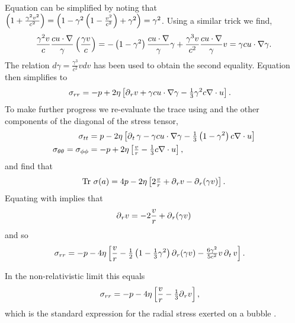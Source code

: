 Equation  can be simplified by noting that $\left( 1 + \tfrac{\gamma^2v^2}{c^2} \right) = \left( 1 - \gamma^2\left( 1-\tfrac{v^2}{c^2} \right) + \gamma^2  \right) =  \gamma^2$.
Using a similar trick we find,
\begin{align}
   \frac{\gamma^2 v}{c} \frac{c u\cdot \nabla }{\gamma}\left( \frac{\gamma v}{c} \right) 
=-\left( 1-\gamma^2  \right) \frac{c u\cdot \nabla }{\gamma}\gamma +\frac{\gamma^3 v}{c^2} \frac{c u\cdot \nabla }{\gamma}v
=\gamma c u\cdot \nabla \gamma. 
\end{align}
The relation $d \gamma = \frac{\gamma^3}{c^2} v d v$ has been used to obtain the second equality.
Equation  then simplifies to
\begin{align}
  \sigma_{rr}  &= -p + 2\eta \left[ {\operatorname{\partial}_r} v + \gamma c u\cdot \nabla\gamma - \tfrac{1}{3}\gamma^2 c\nabla\cdot u \right]. \label{eqn:sigmarr2}
\end{align}
To make further progress we re-evaluate the trace using  and the other components of the diagonal of the stress tensor,
\begin{align}
  \sigma_{tt} &= p - 2 \eta \left[ \operatorname{\partial}_t \gamma - \gamma c u \cdot \nabla \gamma - \tfrac{1}{3} \left( 1-\gamma^2 \right) c \nabla\cdot u     \right]\\
  \sigma_{\theta\theta} =  \sigma_{\phi\phi}  &= -p + 2\eta\left[ \tfrac{v}{r} - \tfrac{1}{3} c \nabla \cdot u \right],
\end{align}
and find that 
\begin{align}
  \textrm{Tr}\ \sigma(a) = 4p - 2 \eta \left[ 2 \tfrac{v}{r} + {\operatorname{\partial}_r} v - {\operatorname{\partial}_r}(\gamma v)  \right].\label{eqn:RelStressTrace2}
\end{align}
Equating  with  implies that
\begin{align}
  {\operatorname{\partial}_r} v = - 2 \frac{v}{r}  + {\operatorname{\partial}_r}(\gamma v)
\end{align}
and so
\begin{align}
  \sigma_{rr}  &= -p - 4\eta \left[   \frac{v}{r}  -\tfrac{1}{2}\left( 1-\tfrac{1}{3}\gamma^2 \right){\operatorname{\partial}_r}(\gamma v) - \tfrac{6\gamma^2}{5c^2} v \operatorname{\partial}_t v   \right]. \label{eqn:sigmarr3}
\end{align}

In the non-relativistic limit this equals 
\begin{align}
 \sigma_{rr}  &= -p - 4\eta \left[   \frac{v}{r}  -\tfrac{1}{3}{\operatorname{\partial}_r} v  \right], \label{eqn:NRsigmarr}
\end{align}
which is  the standard expression for the radial stress exerted on a bubble \cite{Hoff2001}.

